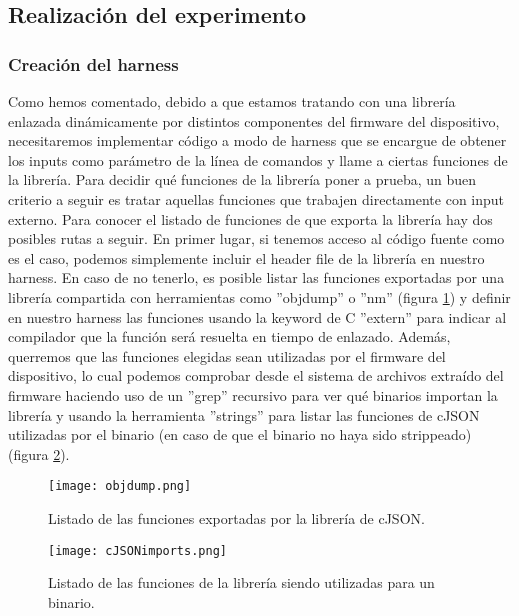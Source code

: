 \subsection{Realización del experimento}
\subsubsection{Creación del harness}
Como hemos comentado, debido a que estamos tratando con una librería enlazada dinámicamente por distintos componentes del firmware del dispositivo, necesitaremos
implementar código a modo de harness que se encargue de obtener los inputs como parámetro de la línea de comandos y llame a ciertas funciones de la librería.
Para decidir qué funciones de la librería poner a prueba, un buen criterio a seguir es tratar aquellas funciones que trabajen directamente 
con input externo. Para conocer el listado de funciones de que exporta la librería hay dos posibles rutas a seguir. En primer lugar, si tenemos acceso al código
fuente como es el caso, podemos simplemente incluir el header file de la librería en nuestro harness. En caso de no tenerlo, es posible listar las funciones
exportadas por una librería compartida con herramientas como ''objdump'' o ''nm'' (figura \ref{fig:objdump}) y definir en nuestro harness las funciones usando 
la keyword de C ''extern'' para indicar al
compilador que la función será resuelta en tiempo de enlazado. Además, querremos que las funciones elegidas sean utilizadas por el firmware del dispositivo, lo
cual podemos comprobar desde el sistema de archivos extraído del firmware haciendo uso de un ''grep'' recursivo para ver qué binarios importan la librería y usando la herramienta ''strings'' para listar
las funciones de cJSON utilizadas por el binario (en caso de que el binario no haya sido strippeado) (figura \ref{fig:cJSONimports}).

\begin{figure}[H]
    \centering
    \texttt{[image: objdump.png]}
    \caption{Listado de las funciones exportadas por la librería de cJSON.}
    \label{fig:objdump}
\end{figure}

\begin{figure}[H]
    \centering
    \texttt{[image: cJSONimports.png]}
    \caption{Listado de las funciones de la librería siendo utilizadas para un binario.}
    \label{fig:cJSONimports}
\end{figure}

